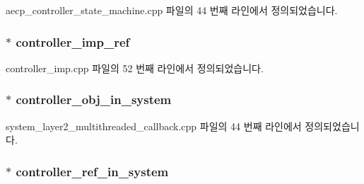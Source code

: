 aecp\+\_\+controller\+\_\+state\+\_\+machine.\+cpp 파일의 44 번째 라인에서 정의되었습니다.

\subsubsection[{\texorpdfstring{controller\+\_\+imp\+\_\+ref}{controller_imp_ref}}]{ $\ast$ controller\+\_\+imp\+\_\+ref}\hypertarget{namespaceavdecc__lib_ac8771a60b14cca3f0e41704835ac30ec}{}\label{namespaceavdecc__lib_ac8771a60b14cca3f0e41704835ac30ec}


controller\+\_\+imp.\+cpp 파일의 52 번째 라인에서 정의되었습니다.

\subsubsection[{\texorpdfstring{controller\+\_\+obj\+\_\+in\+\_\+system}{controller_obj_in_system}}]{$\ast$ controller\+\_\+obj\+\_\+in\+\_\+system}\hypertarget{namespaceavdecc__lib_aa57af65842215e8122158a5fd2e31718}{}\label{namespaceavdecc__lib_aa57af65842215e8122158a5fd2e31718}


system\+\_\+layer2\+\_\+multithreaded\+\_\+callback.\+cpp 파일의 44 번째 라인에서 정의되었습니다.

\subsubsection[{\texorpdfstring{controller\+\_\+ref\+\_\+in\+\_\+system}{controller_ref_in_system}}]{ $\ast$ controller\+\_\+ref\+\_\+in\+\_\+system}\hypertarget{namespaceavdecc__lib_a8f621b84ee2ae87ab9a54ca441e21f9b}{}\label{namespaceavdecc__lib_a8f621b84ee2ae87ab9a54ca441e21f9b}


